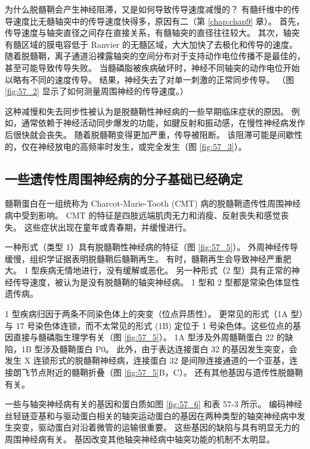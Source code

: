 为什么脱髓鞘会产生神经阻滞，又是如何导致传导速度减慢的？ 有髓纤维中的传导速度比无髓轴突中的传导速度快得多，原因有二（第 \ref{chap:chap9} 章）。 首先，传导速度与轴突直径之间存在直接关系，有髓轴突的直径往往较大。 其次，轴突有髓区域的膜电容低于 Ranvier 的无髓区域，大大加快了去极化和传导的速度。 随着脱髓鞘，离子通道沿裸露轴突的空间分布对于支持动作电位传播不是最佳的，甚至可能导致传导失败。 当髓磷脂被疾病破坏时，神经不同轴突的动作电位开始以略有不同的速度传导。 结果，神经失去了对单一刺激的正常同步传导。 （图 \ref{fig:57_2} 显示了如何测量周围神经的传导速度。）

这种减慢和失去同步性被认为是脱髓鞘性神经病的一些早期临床症状的原因。 例如，通常依赖于神经活动同步爆发的功能，如腱反射和振动感，在慢性神经病发作后很快就会丧失。 随着脱髓鞘变得更加严重，传导被阻断。 该阻滞可能是间歇性的，仅在神经放电的高频率时发生，或完全发生（图 \ref{fig:57_3}）。

\subsection{一些遗传性周围神经病的分子基础已经确定}
髓鞘蛋白在一组统称为 Charcot-Marie-Tooth (CMT) 病的脱髓鞘遗传性周围神经病中受到影响。 CMT 的特征是四肢远端肌肉无力和消瘦、反射丧失和感觉丧失。 这些症状出现在童年或青春期，并缓慢进行。

一种形式（类型 1）具有脱髓鞘性神经病的特征（图 \ref{fig:57_5}）。 外周神经传导缓慢，组织学证据表明脱髓鞘后髓鞘再生。 有时，髓鞘再生会导致神经严重肥大。 1 型疾病无情地进行，没有缓解或恶化。 另一种形式（2 型）具有正常的神经传导速度，被认为是没有脱髓鞘的轴突神经病。 1 型和 2 型都是常染色体显性遗传病。

1 型疾病归因于两条不同染色体上的突变（位点异质性）。 更常见的形式（1A 型）与 17 号染色体连锁，而不太常见的形式 (1B) 定位于 1 号染色体。这些位点的基因直接与髓磷脂生理学有关（图 \ref{fig:57_5}）。 1A 型涉及外周髓鞘蛋白 22 的缺陷，1B 型涉及髓鞘蛋白 P0。 此外，由于表达连接蛋白 32 的基因发生突变，会发生 X 连锁形式的脱髓鞘神经病，连接蛋白 32 是间隙连接通道的一个亚基，连接朗飞节点附近的髓鞘折叠（图 \ref{fig:57_5}B，C）。 还有其他基因与遗传性脱髓鞘有关。

一些与轴突神经病有关的基因和蛋白质如图 \ref{fig:57_6} 和表 57-3 所示。 编码神经丝轻链亚基和与驱动蛋白相关的轴突运动蛋白的基因在两种类型的轴突神经病中发生突变，驱动蛋白对沿着微管的运输很重要。 这些基因的缺陷与具有明显无力的周围神经病有关。 基因改变其他轴突神经病中轴突功能的机制不太明显。

